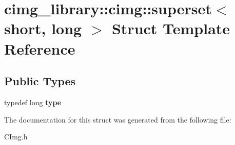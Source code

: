 \hypertarget{structcimg__library_1_1cimg_1_1superset_3_01short_00_01long_01_4}{\section{cimg\-\_\-library\-:\-:cimg\-:\-:superset$<$ short, long $>$ Struct Template Reference}
\label{structcimg__library_1_1cimg_1_1superset_3_01short_00_01long_01_4}
}
\subsection*{Public Types}
\begin{DoxyCompactItemize}
\item 
\hypertarget{structcimg__library_1_1cimg_1_1superset_3_01short_00_01long_01_4_a7e2717edbdcbd4623efe24c9f052b97b}{typedef long {\bfseries type}}\label{structcimg__library_1_1cimg_1_1superset_3_01short_00_01long_01_4_a7e2717edbdcbd4623efe24c9f052b97b}

\end{DoxyCompactItemize}


The documentation for this struct was generated from the following file\-:\begin{DoxyCompactItemize}
\item 
C\-Img.\-h\end{DoxyCompactItemize}
